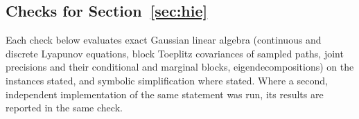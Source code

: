\subsection{Checks for \texorpdfstring{Section~\ref{sec:hie}}{hierarchy}}\label{chk:hie}

Each check below evaluates exact Gaussian linear algebra (continuous and discrete Lyapunov equations, block Toeplitz covariances of sampled paths, joint precisions and their conditional and marginal blocks, eigendecompositions) on the instances stated, and symbolic simplification where stated. Where a second, independent implementation of the same statement was run, its results are reported in the same check.

